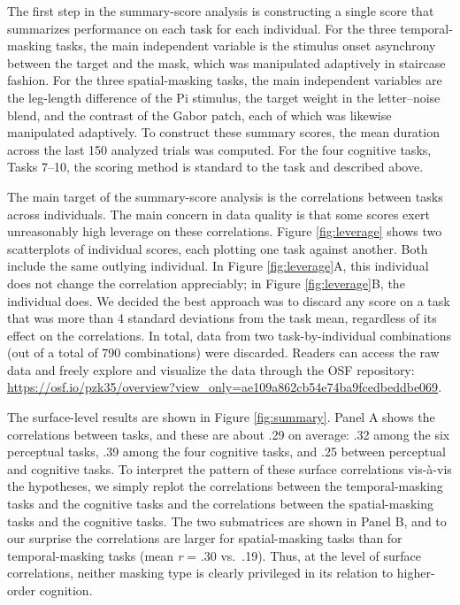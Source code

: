 \documentclass[
  ,man]{apa6}
\begin{document}
The first step in the summary-score analysis is constructing a single score that summarizes performance on each task for each individual. For the three temporal-masking tasks, the main independent variable is the stimulus onset asynchrony between the target and the mask, which was manipulated adaptively in staircase fashion. For the three spatial-masking tasks, the main independent variables are the leg-length difference of the Pi stimulus, the target weight in the letter--noise blend, and the contrast of the Gabor patch, each of which was likewise manipulated adaptively. To construct these summary scores, the mean duration across the last 150 analyzed trials was computed. For the four cognitive tasks, Tasks 7--10, the scoring method is standard to the task and described above.

The main target of the summary-score analysis is the correlations between tasks across individuals. The main concern in data quality is that some scores exert unreasonably high leverage on these correlations. Figure \ref{fig:leverage} shows two scatterplots of individual scores, each plotting one task against another. Both include the same outlying individual. In Figure \ref{fig:leverage}A, this individual does not change the correlation appreciably; in Figure \ref{fig:leverage}B, the individual does. We decided the best approach was to discard any score on a task that was more than 4 standard deviations from the task mean, regardless of its effect on the correlations. In total, data from two task-by-individual combinations (out of a total of 790 combinations) were discarded. Readers can access the raw data and freely explore and visualize the data through the OSF repository: \url{https://osf.io/pzk35/overview?view_only=ae109a862cb54e74ba9fcedbeddbe069}.

The surface-level results are shown in Figure \ref{fig:summary}. Panel A shows the correlations between tasks, and these are about .29 on average: .32 among the six perceptual tasks, .39 among the four cognitive tasks, and .25 between perceptual and cognitive tasks. To interpret the pattern of these surface correlations vis-à-vis the hypotheses, we simply replot the correlations between the temporal-masking tasks and the cognitive tasks and the correlations between the spatial-masking tasks and the cognitive tasks. The two submatrices are shown in Panel B, and to our surprise the correlations are larger for spatial-masking tasks than for temporal-masking tasks (mean \emph{r} = .30 vs.~.19). Thus, at the level of surface correlations, neither masking type is clearly privileged in its relation to higher-order cognition.
\end{document}
